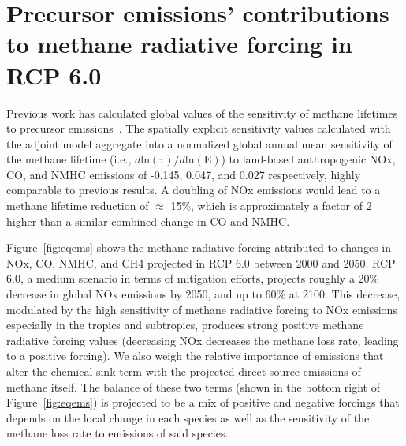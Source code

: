 \section{Precursor emissions' contributions to methane radiative forcing in RCP 6.0}

Previous work has calculated global values of the sensitivity of methane lifetimes to precursor emissions~\citep{ref:fry2012,ref:holmes2013}. The spatially explicit sensitivity values calculated with the adjoint model aggregate into a normalized global annual mean sensitivity of the methane lifetime (i.e., $d \mathrm{ln}(\tau)/d\mathrm{ln}(\mathrm{E})$) to land-based anthropogenic NOx, CO, and NMHC emissions of -0.145, 0.047, and 0.027 respectively, highly comparable to previous results. A doubling of NOx emissions would lead to a methane lifetime reduction of $\approx$ 15\%, which is approximately a factor of 2 higher than a similar combined change in CO and NMHC.  


Figure~\ref{fig:eqems} shows the methane radiative forcing attributed to changes in NOx, CO, NMHC, and CH4 projected in RCP 6.0 between 2000 and 2050. RCP 6.0, a medium scenario in terms of mitigation efforts, projects roughly a 20\% decrease in global NOx emissions by 2050, and up to 60\% at 2100. This decrease, modulated by the high sensitivity of methane radiative forcing to NOx emissions especially in the tropics and subtropics, produces strong positive methane radiative forcing values (decreasing NOx decreases the methane loss rate, leading to a positive forcing). We also weigh the relative importance of emissions that alter the chemical sink term with the projected direct source emissions of methane itself. The balance of these two terms (shown in the bottom right of Figure~\ref{fig:eqems}) is projected to be a mix of positive and negative forcings that depends on the local change in each species as well as the sensitivity of the methane loss rate to emissions of said species.


